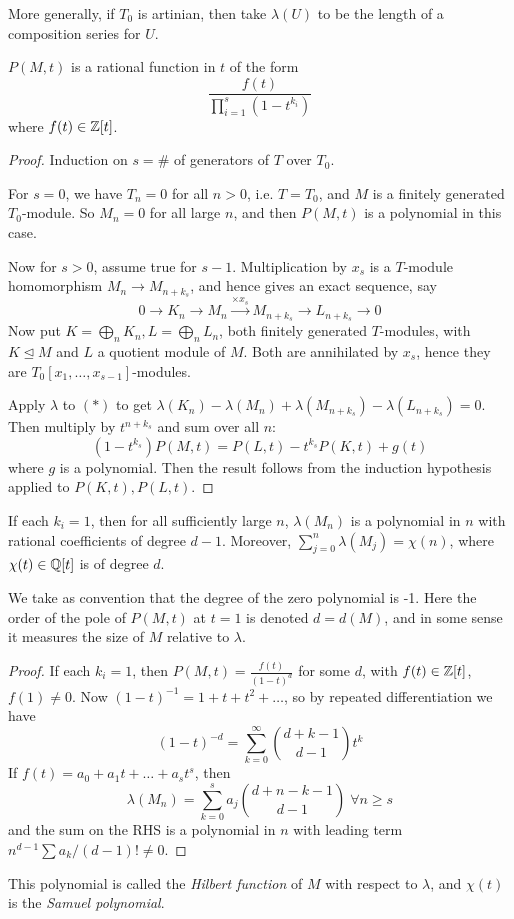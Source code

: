 \documentclass[10pt,a4paper]{article}
\begin{document}
More generally, if $T_0$ is artinian, then take $\lambda(U)$ to be the length of a composition series for $U$.
\begin{theorem}
  $P(M,t)$ is a rational function in $t$ of the form
  \[\frac{f(t)}{\prod_{i=1}^s(1-t^{k_i})}\]
  where $f(t) \in \mathbb{Z}[t]$.
\end{theorem}
\begin{proof}
  Induction on $s = \#$ of generators of $T$ over $T_0$.

  For $s = 0$, we have $T_n = 0$ for all $n >0$, i.e. $T = T_0$, and $M$ is a finitely generated $T_0$-module. So $M_n = 0$ for all large $n$, and then $P(M,t)$ is a polynomial in this case.

  Now for $s> 0$, assume true for $s-1$. Multiplication by $x_s$ is a $T$-module homomorphism $M_n \to M_{n+k_s}$, and hence gives an exact sequence, say
  \[0 \to K_n \to M_n \xrightarrow{\times x_s} M_{n+k_s} \to L_{n+k_s} \to 0\tag{$\ast$}\]
  Now put $K = \bigoplus_n K_n, L = \bigoplus_n L_n$, both finitely generated $T$-modules, with $K \trianglelefteq M$ and $L$ a quotient module of $M$. Both are annihilated by $x_s$, hence they are $T_0[x_1, \ldots, x_{s-1}]$-modules.

  Apply $\lambda$ to $(\ast)$ to get $\lambda(K_n) - \lambda(M_n) + \lambda(M_{n+k_s}) - \lambda(L_{n+k_s}) = 0$. Then multiply by $t^{n+k_s}$ and sum over all $n$:
  \[(1-t^{k_s})P(M,t) = P(L,t) - t^{k_s}P(K,t) + g(t)\]
  where $g$ is a polynomial. Then the result follows from the induction hypothesis applied to $P(K,t), P(L,t)$.
\end{proof}
\begin{corollary}
  If each $k_i = 1$, then for all sufficiently large $n$, $\lambda(M_n)$ is a polynomial in $n$ with rational coefficients of degree $d-1$. Moreover, $\sum_{j=0}^n \lambda(M_j) = \chi(n)$, where $\chi(t) \in \mathbb{Q}[t]$ is of degree $d$.

  We take as convention that the degree of the zero polynomial is -1. Here the order of the pole of $P(M,t)$ at $t=1$ is denoted $d = d(M)$, and in some sense it measures the size of $M$ relative to $\lambda$.
\end{corollary}
\begin{proof}
  If each $k_i = 1$, then $P(M,t) = \frac{f(t)}{(1-t)^d}$ for some $d$, with $f(t) \in \mathbb{Z}[t]$, $f(1) \neq 0$. Now $(1-t)^{-1} = 1+t+t^2+ \ldots$, so by repeated differentiation we have
  \[(1-t)^{-d} = \sum_{k=0}^\infty \binom{d+k-1}{d-1}t^k\]
  If $f(t) = a_0 + a_1t + \ldots + a_st^s$, then
  \[\lambda(M_n) = \sum_{k=0}^s a_j\binom{d+n-k-1}{d-1}\;\forall n\geq s\]
  and the sum on the RHS is a polynomial in $n$ with leading term $n^{d-1}\sum a_k / (d-1)! \neq 0$.
\end{proof}
This polynomial is called the \emph{Hilbert function} of $M$ with respect to $\lambda$, and $\chi(t)$ is the \emph{Samuel polynomial}.
\end{document}
